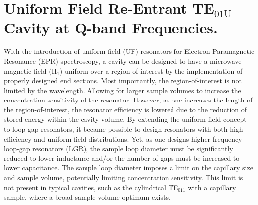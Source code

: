 \chapter[Uniform Field TE01U Cavity at Q-band Frequencies]{Uniform Field Re-Entrant TE$_{01\text{U}}$ Cavity at Q-band Frequencies.}

With the introduction of uniform field (UF) resonators for Electron Paramagnetic Resonance (EPR) spectroscopy, a cavity can be designed to have a microwave magnetic field (H$_1$) uniform over a region-of-interest by the implementation of properly designed end sections. \cite{mett2001axially, anderson2002, mett2002recav, hyde2004cavity} Most importantly, the region-of-interest is not limited by the wavelength. Allowing for larger sample volumes to increase the concentration sensitivity of the resonator. However, as one increases the length of the region-of-interest, the resonator efficiency is lowered due to the reduction of stored energy within the cavity volume. By extending the uniform field concept to loop-gap resonators,\cite{UFLGR} it became possible to design resonators with both high efficiency and uniform field distributions. \cite{UFLGR2017}  
Yet, as one designs higher frequency loop-gap resonators (LGR), the sample loop diameter must be significantly reduced to lower inductance and/or the number of gaps must be increased to lower capacitance. \cite{Sidabras2007, MainaliLGR, UFLGR2017} The sample loop diameter imposes a limit on the capillary size and sample volume, potentially limiting concentration sensitivity. This limit is not present in typical cavities, such as the cylindrical TE$_{011}$ with a capillary sample, where a broad sample volume optimum exists. \cite{Nesmelov2004} 

